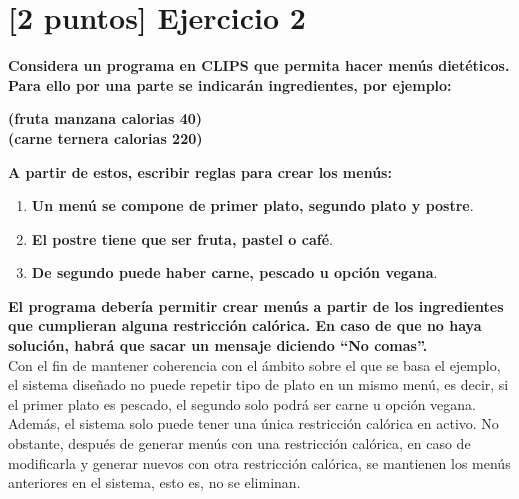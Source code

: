 \newpage
{}
\section{[2 puntos] Ejercicio 2}
\textbf{Considera un programa en CLIPS que permita hacer menús dietéticos.
Para ello por una parte se indicarán ingredientes, por ejemplo:}

\begin{center}
    \textbf{(fruta manzana calorias 40)}\\
    \textbf{(carne ternera calorias 220)}\\
\end{center}

\textbf{A partir de estos, escribir reglas para crear los menús:}
\begin{enumerate}[label=\alph*)]
    \item \textbf{Un menú se compone de primer plato, segundo plato y postre}.
    \item \textbf{El postre tiene que ser fruta, pastel o café}.
    \item \textbf{De segundo puede haber carne, pescado u opción vegana}. \\
\end{enumerate}

\textbf{El programa debería permitir crear menús a partir de los ingredientes que
cumplieran alguna restricción calórica. En caso de que no haya solución, habrá que
sacar un mensaje diciendo “No comas”.} \\

Con el fin de mantener coherencia con el ámbito sobre el que se basa el ejemplo, el sistema
diseñado no puede repetir tipo de plato en un mismo menú, es decir, si el primer plato 
es pescado, el segundo solo podrá ser carne u opción vegana. \\

Además, el sistema solo puede tener una única restricción calórica en activo. No obstante,
después de generar menús con una restricción calórica, en caso de modificarla y generar 
nuevos con otra restricción calórica, se mantienen los menús anteriores en el sistema,
esto es, no se eliminan. \\

